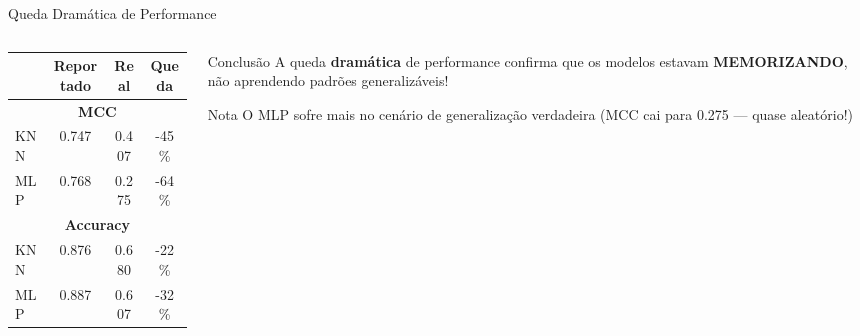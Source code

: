 \documentclass[aspectratio=169,11pt]{beamer}
\begin{document}
\begin{frame}{Queda Dramática de Performance}
    \begin{columns}
        \begin{column}{0.5\textwidth}
            \begin{table}
                \centering
                \begin{tabular}{lccc}
                    \toprule
                    & \textbf{Reportado} & \textbf{Real} & \textbf{Queda} \\
                    \midrule
                    \multicolumn{4}{c}{\textbf{MCC}} \\
                    \midrule
                    KNN & 0.747 & 0.407 & \textcolor{alertred}{-45\%} \\
                    MLP & 0.768 & 0.275 & \textcolor{alertred}{-64\%} \\
                    \midrule
                    \multicolumn{4}{c}{\textbf{Accuracy}} \\
                    \midrule
                    KNN & 0.876 & 0.680 & \textcolor{alertred}{-22\%} \\
                    MLP & 0.887 & 0.607 & \textcolor{alertred}{-32\%} \\
                    \bottomrule
                \end{tabular}
            \end{table}
        \end{column}
        \begin{column}{0.5\textwidth}
            \begin{alertblock}{Conclusão}
                A queda \textbf{dramática} de performance confirma que os modelos estavam \textbf{MEMORIZANDO}, não aprendendo padrões generalizáveis!
            \end{alertblock}

            \vspace{0.3cm}
            \begin{block}{Nota}
                O MLP sofre mais no cenário de generalização verdadeira (MCC cai para 0.275 --- quase aleatório!)
            \end{block}
        \end{column}
    \end{columns}
\end{frame}

\end{document}
